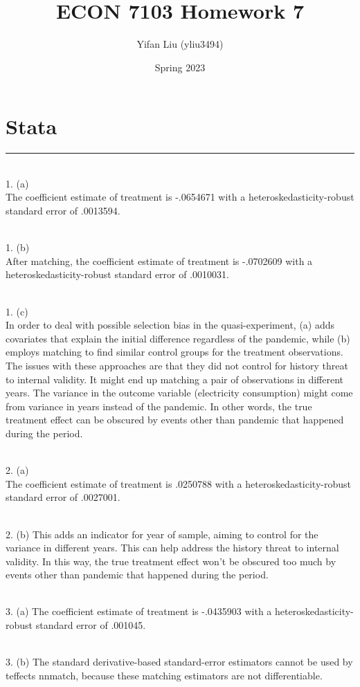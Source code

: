 \documentclass{article}
\title{ECON 7103 Homework 7}
\author{Yifan Liu (yliu3494)}
\date{Spring 2023}
\begin{document}
  
\maketitle


\noindent

\section{Stata}
\rule{17cm}{0.4pt}
\smallskip
\\ 1. (a)
\\ The coefficient estimate of treatment is -.0654671 with a heteroskedasticity-robust standard error of .0013594.

\noindent
\\ 1. (b)
\\ After matching, the coefficient estimate of treatment is -.0702609 with a heteroskedasticity-robust standard error of .0010031.

\noindent
\\ 1. (c)
\\ In order to deal with possible selection bias in the quasi-experiment, (a) adds covariates that explain the initial difference regardless of the pandemic, while (b) employs matching to find similar control groups for the treatment observations. 
\\ The issues with these approaches are that they did not control for history threat to internal validity. It might end up matching a pair of observations in different years. The variance in the outcome variable (electricity consumption) might come from variance in years instead of the pandemic. In other words, the true treatment effect can be obscured by events other than pandemic that happened during the period. 

\noindent
\\ 2. (a)
\\ The coefficient estimate of treatment is .0250788  with a heteroskedasticity-robust standard error of .0027001.

\noindent
\\ 2. (b)
This adds an indicator for year of sample, aiming to control for the variance in different years. This can help address the history threat to internal validity. In this way, the true treatment effect won't be obscured too much by events other than pandemic that happened during the period. 

\noindent
\\ 3. (a)
The coefficient estimate of treatment is  -.0435903 with a heteroskedasticity-robust standard error of .001045.

\noindent
\\ 3. (b)
The standard derivative-based standard-error estimators cannot be used by teffects nnmatch, because these matching estimators are not differentiable. 
\end{document}
